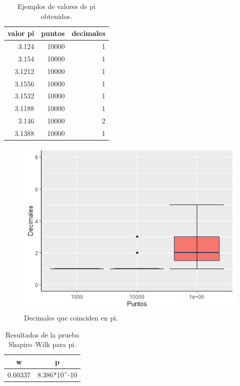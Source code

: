 \documentclass{article}
\begin{document}
\begin{table}[h!]
\centering
\caption{Ejemplos de valores de pi obtenidos.}
\label{tabla5}
\begin{tabular}{|r|r|r|}
\hline
\multicolumn{1}{|l|}{valor pi} & \multicolumn{1}{l|}{puntos} & \multicolumn{1}{l|}{decimales} \\ \hline
3.124 & 10000 & 1 \\ \hline
3.154 & 10000 & 1 \\ \hline
3.1212 & 10000 & 1 \\ \hline
3.1556 & 10000 & 1 \\ \hline
3.1532 & 10000 & 1 \\ \hline
3.1188 & 10000 & 1 \\ \hline
3.146 & 10000 & 2 \\ \hline
3.1388 & 10000 & 1 \\ \hline
\end{tabular}
\end{table}

\newpage

\begin{figure} [h!]%
\renewcommand{\figurename}{Gráfica}
    \centering
    \caption{Decimales que coinciden en pi.}
    \label{grafica2}
    \includegraphics[width=120mm]{grafica2.png} %
\end{figure}

\begin{table}[h!]
\centering
\caption{Resultados de la prueba Shapiro–Wilk para pi.}
\label{tabla6}
\begin{tabular}{|c|c|}
\hline
w & p \\ \hline
\multicolumn{1}{|r|}{0.60337} & \multicolumn{1}{r|}{8.386*10\textasciicircum{}-10} \\ \hline
\end{tabular}
\end{table}
\end{document}
